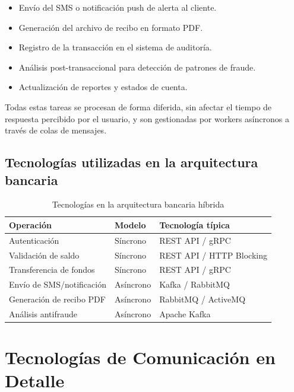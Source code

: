 \documentclass[12pt,a4paper]{article}
\begin{document}
\begin{itemize}
  \item Envío del SMS o notificación push de alerta al cliente.
  \item Generación del archivo de recibo en formato PDF.
  \item Registro de la transacción en el sistema de auditoría.
  \item Análisis post-transaccional para detección de patrones de fraude.
  \item Actualización de reportes y estados de cuenta.
\end{itemize}
 
Todas estas tareas se procesan de forma diferida, sin afectar el tiempo de respuesta percibido por el usuario, y son gestionadas por workers asíncronos a través de colas de mensajes.
 
\subsection{Tecnologías utilizadas en la arquitectura bancaria}
 
\begin{table}[H]
\centering
\caption{Tecnologías en la arquitectura bancaria híbrida}
\label{tab:banco}
\renewcommand{\arraystretch}{1.3}
\begin{tabularx}{\textwidth}{|X|X|X|}
\hline
\textbf{Operación} & \textbf{Modelo} & \textbf{Tecnología típica} \\
\hline
Autenticación & Síncrono & REST API / gRPC \\
\hline
Validación de saldo & Síncrono & REST API / HTTP Blocking \\
\hline
Transferencia de fondos & Síncrono & REST API / gRPC \\
\hline
Envío de SMS/notificación & Asíncrono & Kafka / RabbitMQ \\
\hline
Generación de recibo PDF & Asíncrono & RabbitMQ / ActiveMQ \\
\hline
Análisis antifraude & Asíncrono & Apache Kafka \\
\hline
\end{tabularx}
\end{table}
 
\section{Tecnologías de Comunicación en Detalle}
 
\end{document}
